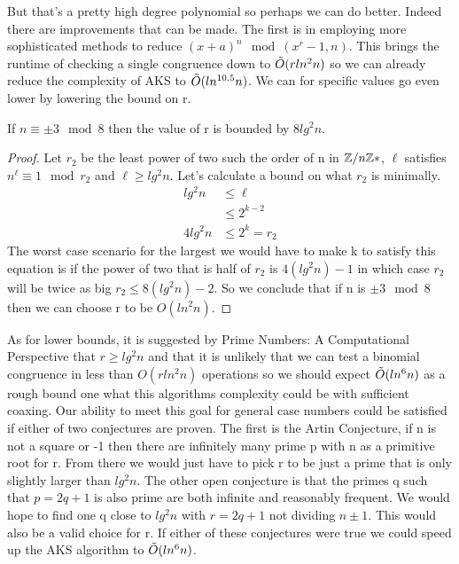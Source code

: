\documentclass{article}
\begin{document}
But that's a pretty high degree polynomial so perhaps we can do better.  Indeed there are improvements that can be made. The first is in employing more sophisticated methods to reduce $( x + a)^n \mod (x^r - 1, n)$. This brings the runtime of checking a single congruence down to $\tilde{O}( r ln^2 n)$ so we can already reduce the complexity of AKS to $\tilde{O}( ln^{10.5} n)$.  We can for specific values go even lower by lowering the bound on r. 
\begin{theorem}
    If $n \equiv \pm 3 \mod 8$ then the value of r is bounded by $8 lg^2 n$.
\end{theorem}
\begin{proof}
    Let $r_2$ be the least power of two such the order of n in $\mathbb{Z} / n \mathbb{Z}*$, $\ell $ satisfies $n^\ell \equiv 1 \mod r_2$ and $\ell \geq lg^2 n$. Let's calculate a bound on what $r_2$ is minimally. 
    \begin{align}
     lg^2 n &\leq \ell \\
     &\leq 2^{k-2} \\
     4 lg^2 n &\leq 2^k = r_2 
    \end{align}
    The worst case scenario for the largest we would have to make k to satisfy this equation is if the power of two that is half of $r_2$ is $4 (lg^2 n) - 1$ in which case $r_2$ will be twice as big $r_2 \leq 8 (lg^2 n) -2$. So we conclude that if n is $\pm 3 \mod 8$ then we can choose r to be $O(ln^2 n)$. 
\end{proof}


As for lower bounds, it is suggested by Prime Numbers: A Computational Perspective that $r \geq lg^2 n$ and that it is unlikely that we can test a binomial congruence in less than $O(r ln^2 n )$ operations so we should expect $\tilde{O}(ln^6 n)$ as a rough bound one what this algorithms complexity could be with sufficient coaxing\cite{crandall2006prime}. Our ability to meet this goal for general case numbers could be satisfied if either of two conjectures are proven. The first is the Artin Conjecture, if n is not a square or -1 then there are infinitely many prime p with n as a primitive root for r. From there we would just have to pick r to be just a prime that is only slightly larger than $lg^2 n$. The other open conjecture is that the primes q such that $p = 2q + 1$ is also prime are both infinite and reasonably frequent. We would hope to find one q close to $lg^2 n $ with $r = 2q + 1$ not dividing $n \pm 1$. This would also be a valid choice for r. If either of these conjectures were true we could speed up the AKS algorithm to $\tilde{O}(ln^6 n )$.
\end{document}
